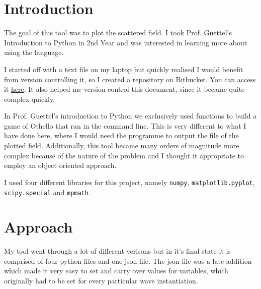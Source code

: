 %
\section{Introduction}
%
The goal of this tool was to plot the scattered field. I took Prof. Guettel's Introduction to Python in 2nd Year and was interested in learning more about using the language. \par
%
I started off with a text file on my laptop but quickly realised I would benefit from version controlling it, so I created a repository on Bitbucket. You can access it \href{https://bitbucket.org/veracruz/canonical_scattering}{here}. It also helped me version control this document, since it became quite complex quickly. \par
%
In Prof. Guettel's introduction to Python we exclusively used functions to build a game of Othello that ran in the command line. This is very different to what I have done here, where I would need the programme to output the file of the plotted field. Additionally, this tool became many orders of magnitude more complex because of the nature of the problem and I thought it appropriate to employ an object oriented approach.\par
%
I used four different libraries for this project, namely \verb!numpy!, \verb!matplotlib.pyplot!, \verb!scipy.special! and \verb!mpmath!.
%
\section{Approach}

My tool went through a lot of different verisons but in it's final state it is comprised of four python files and one json file. The json file was a late addition which made it very easy to set and carry over values for variables, which originally had to be set for every particular wave instantiation.\par

